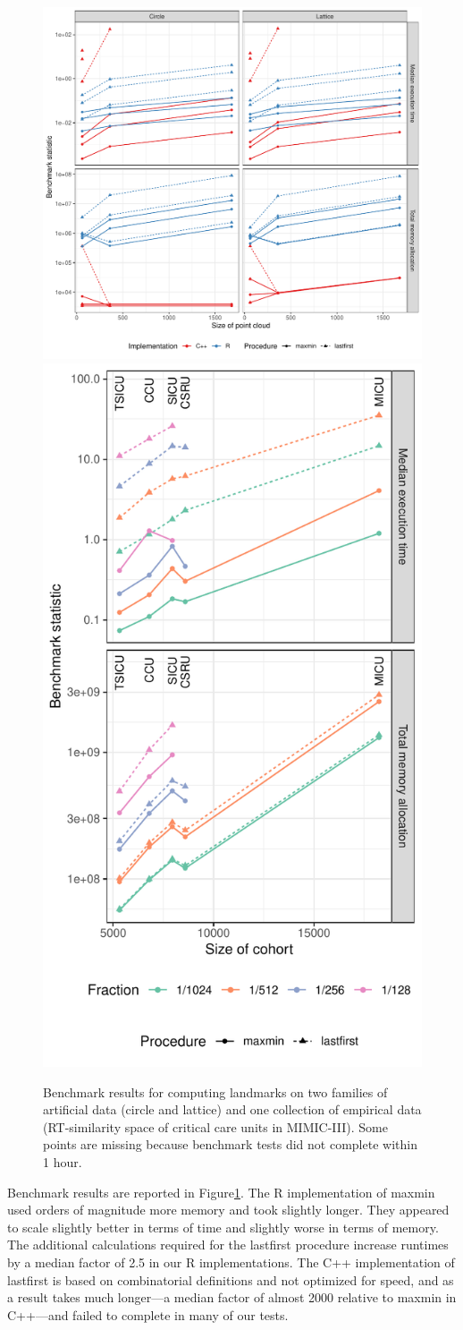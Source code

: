 \documentclass[
]{article}
\begin{document}
\begin{figure}
\includegraphics[width=.6666667\textwidth]{../figures/benchmark-circle-lattice}
\includegraphics[width=.3333333\textwidth]{../figures/benchmark-mimic}
\caption{
Benchmark results for computing landmarks on two families of artificial data (circle and lattice) and one collection of empirical data (RT-similarity space of critical care units in MIMIC-III). Some points are missing because benchmark tests did not complete within 1 hour.
\label{fig:benchmark}
}
\end{figure}

Benchmark results are reported in Figure\nbs\ref{fig:benchmark}. The R
implementation of maxmin used orders of magnitude more memory and took
slightly longer. They appeared to scale slightly better in terms of time
and slightly worse in terms of memory. The additional calculations
required for the lastfirst procedure increase runtimes by a median
factor of 2.5 in our R implementations. The C++ implementation of
lastfirst is based on combinatorial definitions and not optimized for
speed, and as a result takes much longer---a median factor of almost
2000 relative to maxmin in C++---and failed to complete in many of our
tests.
\end{document}
